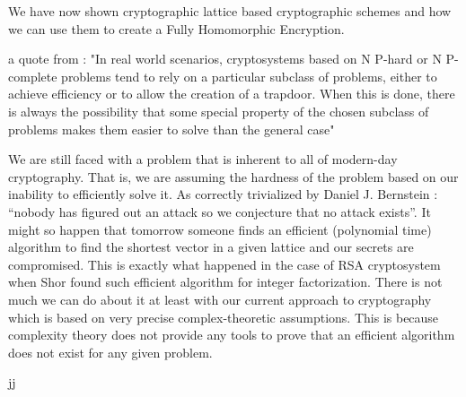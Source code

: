 We have now shown cryptographic lattice based cryptographic schemes and how we can use them to create a Fully Homomorphic Encryption.

a quote from \cite{intro_cryp}: "In real world scenarios, cryptosystems based on N P-hard or N P-complete problems tend to rely on a particular subclass of problems, either to achieve efficiency or to allow the creation of a trapdoor. When this is done, there is always the possibility that some special property of the chosen subclass of problems makes them easier to solve than the general case"
\begin{remark}
    We are still faced with a problem that is inherent to all of modern-day cryptography. That is, we are assuming the hardness of the problem based on our inability to efficiently solve it. As correctly trivialized by Daniel J. Bernstein \cite{bernstein}: ``nobody has figured out an attack so we conjecture that no attack exists''. It might so happen that tomorrow someone finds an efficient (polynomial time) algorithm to find the shortest vector in a given lattice and our secrets are compromised. This is exactly what happened in the case of RSA cryptosystem when Shor found such efficient algorithm for integer factorization. There is not much we can do about it at least with our current approach to cryptography which is based on very precise complex-theoretic assumptions. This is because complexity theory does not provide any tools to prove that an efficient algorithm does not exist for any given problem.
\end{remark}
jj